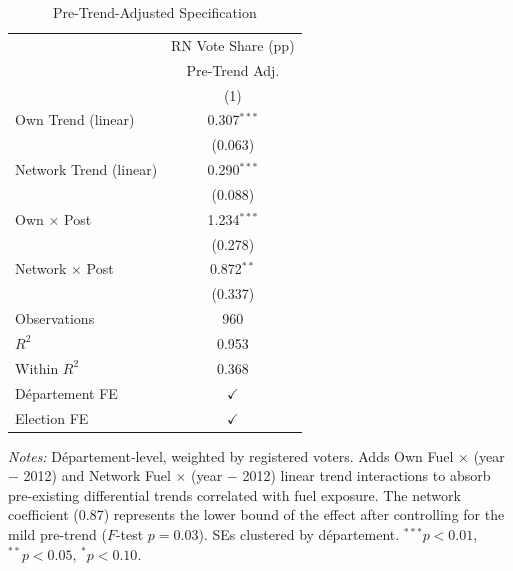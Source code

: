 \begin{table}[htbp]
   \caption{\label{tab:additional_robustness} Pre-Trend-Adjusted Specification}
   \bigskip
   \centering
   \begin{tabular}{@{}lc@{}}
      \toprule
                                                  & RN Vote Share (pp)\\
                                                  & Pre-Trend Adj. \\
                                                  & (1)\\
      \midrule
      Own Trend (linear)                          & 0.307$^{***}$\\
                                                  & (0.063)\\[4pt]
      Network Trend (linear)                      & 0.290$^{***}$\\
                                                  & (0.088)\\[4pt]
      Own $\times$ Post                           & 1.234$^{***}$\\
                                                  & (0.278)\\[4pt]
      Network $\times$ Post                       & 0.872$^{**}$\\
                                                  & (0.337)\\
      \midrule
      Observations                                & 960\\
      $R^2$                                       & 0.953\\
      Within $R^2$                                & 0.368\\
      \midrule
      D\'{e}partement FE                          & $\checkmark$\\
      Election FE                                 & $\checkmark$\\
      \bottomrule
   \end{tabular}

   \par \raggedright \smallskip
   \textit{Notes:} D\'{e}partement-level, weighted by registered voters. Adds Own Fuel $\times$ (year $-$ 2012) and Network Fuel $\times$ (year $-$ 2012) linear trend interactions to absorb pre-existing differential trends correlated with fuel exposure. The network coefficient (0.87) represents the lower bound of the effect after controlling for the mild pre-trend ($F$-test $p = 0.03$). SEs clustered by d\'{e}partement. $^{***}p<0.01$, $^{**}p<0.05$, $^{*}p<0.10$.
\end{table}
